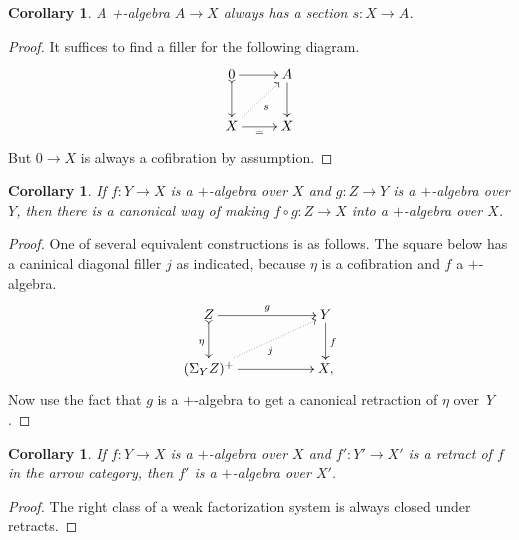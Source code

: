 \documentclass[12pt]{article}
\newcommand{\ra}{\ensuremath{\rightarrow}}
\newtheorem{corollary}[theorem]{Corollary}
\theoremstyle{remark}
\theoremstyle{definition}
\begin{document}
\begin{corollary}\label{cor:plusalgsection} 
A +-algebra $A\ra X$ always has a section $s : X\ra A$.
\end{corollary}
\begin{proof}
It suffices to find a filler for the following diagram.
\begin{equation}\label{diagram:plussection}
\xymatrix{
0 \ar@{>->}[d] \ar[r] & A \ar[d] \\
X\ar@{.>}[ru]_s \ar[r]_{=} & X
}
\end{equation}
But $0 \ra X$ is always a cofibration by assumption.
\end{proof}

\begin{corollary}\label{cor:plusalgcompose} 
If $f:Y\ra X$ is a $+$-algebra over $X$ and $g:Z\ra Y$ is a $+$-algebra over $Y$, then there is a canonical way of making  $f\circ g:Z\ra X$ into a $+$-algebra over $X$.
\end{corollary}
\begin{proof}
One of several equivalent constructions is as follows. The square below has a caninical diagonal filler $j$ as indicated, because $\eta$ is a cofibration and $f$ a $+$-algebra.
\begin{equation}\label{diagram:pluscompose}
\xymatrix{
Z \ar@{>->}[d]_{\eta} \ar[rr]^{g} && Y \ar[d]^{f} \\
(\Sigma_YZ)^+\ar@{.>}[rru]_{j} \ar[rr] && X,
}
\end{equation}
Now use the fact that $g$ is a $+$-algebra to get a canonical retraction of $\eta$ over~$Y$.
\end{proof}

\begin{corollary}\label{cor:plusalgretract} 
If $f:Y\ra X$ is a $+$-algebra over $X$ and $f':Y'\ra X'$ is a retract of $f$ in the arrow category, then $f'$ is a $+$-algebra over $X'$.
\end{corollary}
\begin{proof}
The right class of a weak factorization system is always closed under retracts.
\end{proof}
\end{document}
